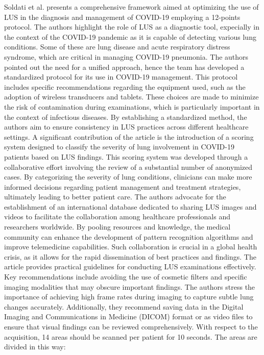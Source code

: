 Soldati et al. \cite{soldati2020proposal} presents a comprehensive framework aimed at optimizing the use of LUS in the diagnosis and management of COVID-19 employing a 12-points protocol. The authors highlight the  role of LUS as a diagnostic tool, expecially in the context of the COVID-19 pandemic as it is capable of detecting various lung conditions. Some of these are lung disease and acute respiratory distress syndrome, which are critical in managing COVID-19 pneumonia.
The authors pointed out the need for a unified approach, hence the team has developed a standardized protocol for its use in COVID-19 management.
This protocol includes specific recommendations regarding the equipment used, such as the adoption of wireless transducers and tablets.
These choices are made to minimize the risk of contamination during examinations, which is particularly important in the context of infectious diseases. 
By establishing a standardized method, the authors aim to ensure consistency in LUS practices across different healthcare settings.
 A significant contribution of the article is the introduction of a scoring system designed to classify the severity of lung involvement in COVID-19 patients based on LUS findings. This scoring system was developed through a collaborative effort involving the review of a substantial number of anonymized cases. By categorizing the severity of lung conditions, clinicians can make more informed decisions regarding patient management and treatment strategies, ultimately leading to better patient care.
The authors advocate for the establishment of an international database dedicated to sharing LUS images and videos to facilitate the collaboration among healthcare professionals and researchers worldwide. By pooling resources and knowledge, the medical community can enhance the development of pattern recognition algorithms and improve telemedicine capabilities. Such collaboration is crucial in a global health crisis, as it allows for the rapid dissemination of best practices and findings. The article provides practical guidelines for conducting LUS examinations effectively. Key recommendations include avoiding the use of cosmetic filters and specific imaging modalities that may obscure important findings. The authors stress the importance of achieving high frame rates during imaging to capture subtle lung changes accurately. Additionally, they recommend saving data in the Digital Imaging and Communications in Medicine (DICOM) format or as video files to ensure that visual findings can be reviewed comprehensively. With respect to the acquisition, 14 areas should be scanned per patient for 10 seconds. The areas are divided in this way:
